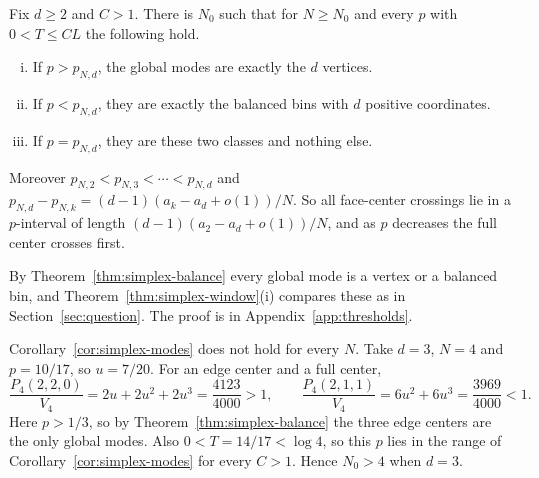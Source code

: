 \begin{corollary}\label{cor:simplex-modes}
Fix $d\ge2$ and $C>1$. There is $N_0$ such that for $N\ge N_0$ and every $p$ with
$0<T\le CL$ the following hold.
\begin{enumerate}[(i)]
\item If $p>p_{N,d}$, the global modes are exactly the $d$ vertices.
\item If $p<p_{N,d}$, they are exactly the balanced bins with $d$ positive
coordinates.
\item If $p=p_{N,d}$, they are these two classes and nothing else.
\end{enumerate}
Moreover $p_{N,2}<p_{N,3}<\cdots<p_{N,d}$ and
$p_{N,d}-p_{N,k}=(d-1)(a_k-a_d+o(1))/N$. So all face-center crossings lie in a
$p$-interval of length $(d-1)(a_2-a_d+o(1))/N$, and as $p$ decreases the full
center crosses first.
\end{corollary}

By Theorem~\ref{thm:simplex-balance} every global mode is a vertex or a
balanced bin, and Theorem~\ref{thm:simplex-window}(i) compares these as in
Section~\ref{sec:question}. The proof is in Appendix~\ref{app:thresholds}.

\begin{example}
\label{ex:simplex-edge-mode}
Corollary~\ref{cor:simplex-modes} does not hold for every $N$. Take $d=3$, $N=4$
and $p=10/17$, so $u=7/20$. For an edge center and a full center,
\[
\frac{P_4(2,2,0)}{V_4}=2u+2u^2+2u^3=\frac{4123}{4000}>1,
\qquad
\frac{P_4(2,1,1)}{V_4}=6u^2+6u^3=\frac{3969}{4000}<1.
\]
Here $p>1/3$, so by Theorem~\ref{thm:simplex-balance} the three edge centers are the
only global modes. Also $0<T=14/17<\log4$, so this $p$ lies in the range of
Corollary~\ref{cor:simplex-modes} for every $C>1$. Hence $N_0>4$ when $d=3$.
\end{example}
